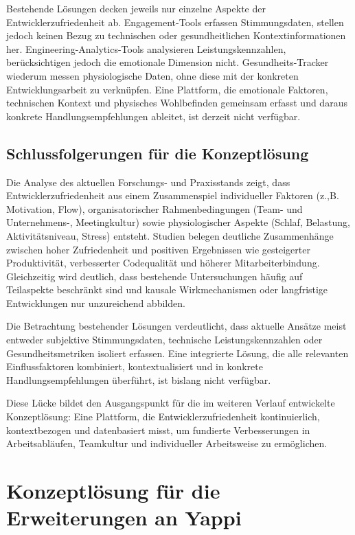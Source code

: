 \documentclass[12pt,a4paper]{report}
\begin{document}
Bestehende Lösungen decken jeweils nur einzelne Aspekte der Entwicklerzufriedenheit ab. Engagement-Tools erfassen Stimmungsdaten,
stellen jedoch keinen Bezug zu technischen oder gesundheitlichen Kontextinformationen her. Engineering-Analytics-Tools analysieren
Leistungskennzahlen, berücksichtigen jedoch die emotionale Dimension nicht. Gesundheits-Tracker wiederum messen physiologische Daten,
ohne diese mit der konkreten Entwicklungsarbeit zu verknüpfen. Eine Plattform, die emotionale Faktoren, technischen Kontext und
physisches Wohlbefinden gemeinsam erfasst und daraus konkrete Handlungsempfehlungen ableitet, ist derzeit nicht verfügbar.

\section{Schlussfolgerungen für die Konzeptlösung}\label{schlussfolgerungen-für-die-konzeptlösung}

Die Analyse des aktuellen Forschungs- und Praxisstands zeigt, dass Entwicklerzufriedenheit aus einem Zusammenspiel individueller
Faktoren (z.,B. Motivation, Flow), organisatorischer Rahmenbedingungen (Team- und Unternehmens-, Meetingkultur) sowie 
physiologischer Aspekte (Schlaf, Belastung, Aktivitätsniveau, Stress) entsteht. Studien belegen deutliche Zusammenhänge zwischen
hoher Zufriedenheit und positiven Ergebnissen wie gesteigerter Produktivität, verbesserter Codequalität und höherer
Mitarbeiterbindung. Gleichzeitig wird deutlich, dass bestehende Untersuchungen häufig auf Teilaspekte beschränkt sind und kausale
Wirkmechanismen oder langfristige Entwicklungen nur unzureichend abbilden.

Die Betrachtung bestehender Lösungen verdeutlicht, dass aktuelle Ansätze meist entweder subjektive Stimmungsdaten, technische
Leistungskennzahlen oder Gesundheitsmetriken isoliert erfassen. Eine integrierte Lösung, die alle relevanten Einflussfaktoren
kombiniert, kontextualisiert und in konkrete Handlungsempfehlungen überführt, ist bislang nicht verfügbar.

Diese Lücke bildet den Ausgangspunkt für die im weiteren Verlauf entwickelte Konzeptlösung: Eine Plattform, die
Entwicklerzufriedenheit kontinuierlich, kontextbezogen und datenbasiert misst, um fundierte Verbesserungen in Arbeitsabläufen,
Teamkultur und individueller Arbeitsweise zu ermöglichen.

\chapter{Konzeptlösung für die Erweiterungen an Yappi}
\end{document}
